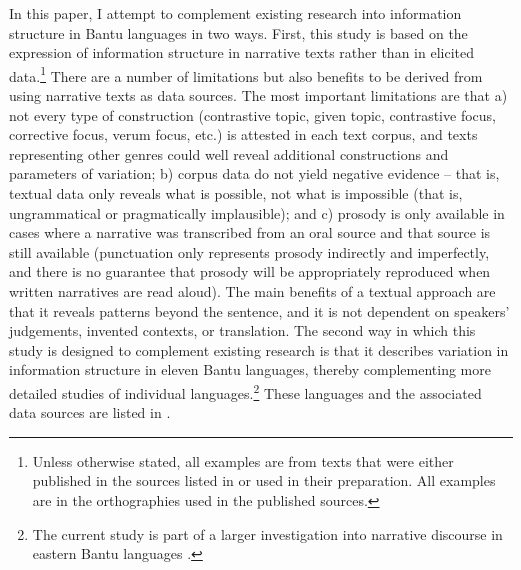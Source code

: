 \documentclass[output=paper]{langsci/langscibook}
\begin{document}
In this paper, I attempt to complement existing research into information structure in Bantu languages in two ways. First, this study is based on the expression of information structure in narrative texts rather than in elicited data.\footnote{Unless otherwise stated, all examples are from texts that were either published in the sources listed in  or used in their preparation. All examples are in the orthographies used in the published sources.} There are a number of limitations but also benefits to be derived from using narrative texts as data sources. The most important limitations are that a) not every type of construction (contrastive topic, given topic, contrastive focus, corrective focus, verum focus, etc.) is attested in each text corpus, and texts representing other genres could well reveal additional constructions and parameters of variation; b) corpus data do not yield negative evidence -- that is, textual data only reveals what is possible, not what is impossible (that is, ungrammatical or pragmatically implausible); and c) prosody is only available in cases where a narrative was transcribed from an oral source and that source is still available (punctuation only represents prosody indirectly and imperfectly, and there is no guarantee that prosody will be appropriately reproduced when written narratives are read aloud). The main benefits of a textual approach are that it reveals patterns beyond the sentence, and it is not dependent on speakers’ judgements, invented contexts, or translation. The second way in which this study is designed to complement existing research is that it describes variation in information structure in eleven Bantu languages, thereby complementing more detailed studies of individual languages.\footnote{The current study is part of a larger investigation into narrative discourse in eastern Bantu languages \citep{nicolle2015b}.} These languages and the associated data sources are listed in .
\end{document}
